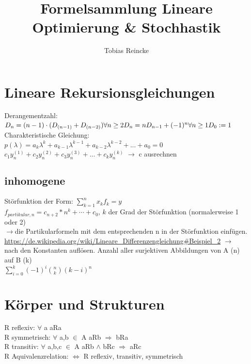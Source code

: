 \documentclass[]{article}
\title{Formelsammlung Lineare Optimierung \& Stochhastik}
\author{Tobias Reincke}
\date{}
\begin{document}
\setlength{\parindent}{0pt} 

\addtolength{\textwidth}{1.0in}
\addtolength{\textheight}{1.00in}
\addtolength{\evensidemargin}{-0.75in}
\addtolength{\oddsidemargin}{-0.75in}
\addtolength{\topmargin}{-.50in}

\newcommand{\set}[1]{$\{$#1$\}$  }

\section{Lineare Rekursionsgleichungen}
Derangementzahl: $D_n =(n-1)\cdot(D_{(n-1)}+D_{(n-2)})  \forall n \geq 2\\
D_n=nD_{n-1}+(-1)^n \forall n\geq 1\\ D_0:=1$\\
Charakteristische Gleichung: $p(\lambda)=a_k \lambda^k + a_{k-1} \lambda^{k-1} + a_{k-2} \lambda^{k-2}+ ... + a_0=0$ \\
$c_1 y_n^{ (1) }+c_2 y_n^{(2)}+c_3 y_n^{(3)}+...+c_k y_n^{(k)}$ $\rightarrow$ c ausrechnen 
\subsection{inhomogene}
Störfunktion der Form: $\sum_{k=1}^{n} x_kf_{k}=y$\\
$f_{partikular,n}= c_{n+2}*n^k+\cdots+c_{0}$, $k$ der Grad der Störfunktion (normalerweise 1 oder 2)\\
$\rightarrow$die Partikularformeln mit dem entsprechenden n in der Störfunktion einfügen.\\
\url{https://de.wikipedia.org/wiki/Lineare_Differenzengleichung#Beispiel_2}
$\rightarrow$ nach den Konstanten auflösen.
Anzahl aller surjektiven Abbildungen von A (n) auf B (k) \\ \centering
$\sum_{i=0}^{k} (-1)^i  \binom{n}{k} (k-i)^n$
\\

\section{Körper und Strukturen}
R reflexiv: $\forall$ a aRa \\
R symmetrisch: $\forall$ a,b $\in$ A   aRb $\Rightarrow$ bRa \\
R transitiv: $\forall$ a,b,c $\in$ A aRb $\land$ bRc $\Rightarrow$ aRc \\
R Aquivalenzrelation: $\Leftrightarrow$ R reflexiv, transitiv, symmetrisch \\
\end{document}

